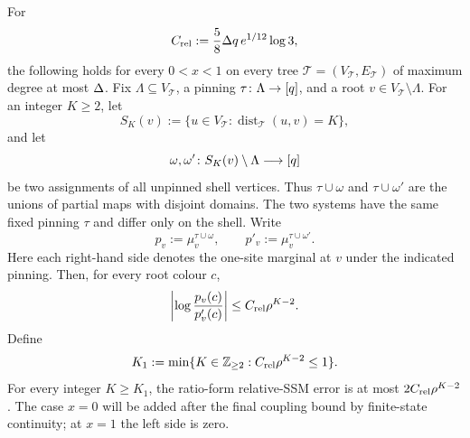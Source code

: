 \begin{lemma}
\label{lem:hg-eventual-relative-ssm}
For
\begin{equation}
 C_{\rm rel}:=\frac58\Delta q\,e^{1/12}\log3,
 \label{eq:hg-relative-constant}
\end{equation}
the following holds for every $0<x<1$ on every tree
\(\mathcal T=(V_{\mathcal T},E_{\mathcal T})\) of maximum degree at
most $\Delta$.  Fix \(\Lambda\subseteq V_{\mathcal T}\), a pinning
\(\tau\colon\Lambda\to[q]\), and a root
\(v\in V_{\mathcal T}\setminus\Lambda\).  For an integer \(K\ge2\), let
\[
  S_K(v):=
  \{u\in V_{\mathcal T}:
       \operatorname{dist}_{\mathcal T}(u,v)=K\},
\]
and let
\[
 \omega,\omega'\colon S_K(v)\setminus\Lambda\longrightarrow
 [q]
\]
be two assignments of all unpinned shell vertices.  Thus
\(\tau\cup\omega\) and \(\tau\cup\omega'\) are the unions of partial maps with
disjoint domains.  The two systems have the same fixed pinning \(\tau\) and
differ only on the shell.  Write
\[
 p_v:=\mu_v^{\tau\cup\omega},
 \qquad
 p'_v:=\mu_v^{\tau\cup\omega'}.
\]
Here each right-hand side denotes the one-site marginal at \(v\) under the
indicated pinning.
Then, for every root colour $c$,
\begin{equation}
 \left|\log\frac{p_v(c)}{p'_v(c)}\right|
 \le C_{\rm rel}\rho^{K-2}.
 \label{eq:hg-eventual-relative-ssm}
\end{equation}
Define
\[
 K_1:=\min\{K\in\mathbb Z_{\ge2}:C_{\rm rel}\rho^{K-2}\le1\}.
\]
For every integer \(K\ge K_1\), the ratio-form relative-SSM error is at most
\(2C_{\rm rel}\rho^{K-2}\).
The case \(x=0\) will be added after the final coupling bound by
finite-state continuity; at \(x=1\) the left side is zero.
\end{lemma}

